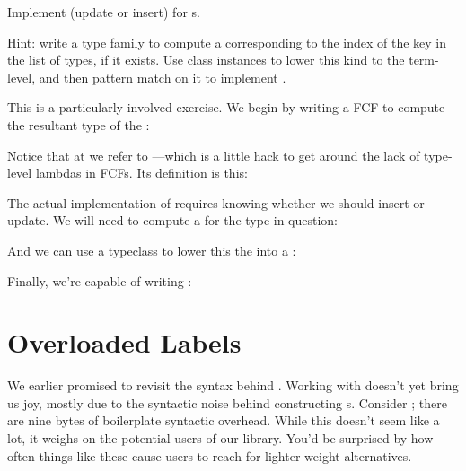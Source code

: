 \documentclass[book.tex]{subfiles}
\begin{document}
\begin{exercise}
Implement  (update or insert) for s.

  Hint: write a type family to compute a  corresponding to the
  index of the key in the list of types, if it exists. Use class instances to
  lower this kind to the term-level, and then pattern match on it to implement
  .
\end{exercise}
\begin{solution}
This is a particularly involved exercise. We begin by writing a FCF to compute
  the resultant type of the :


  Notice that at  we refer to ---which is a little
  hack to get around the lack of type-level lambdas in FCFs. Its definition is
  this:


  The actual implementation of  requires knowing whether we should
  insert or update. We will need to compute a  for the type in
  question:


  And we can use a typeclass to lower this the  into a :


  Finally, we're capable of writing :

\end{solution}


\section{Overloaded Labels}
\label{OverloadedLabels}

We earlier promised to revisit the syntax behind . Working with
 doesn't yet bring us joy, mostly due to the syntactic noise
behind constructing s. Consider ; there are
nine bytes of boilerplate syntactic overhead. While this doesn't seem like a
lot, it weighs on the potential users of our library. You'd be surprised by how
often things like these cause users to reach for lighter-weight alternatives.
\end{document}
